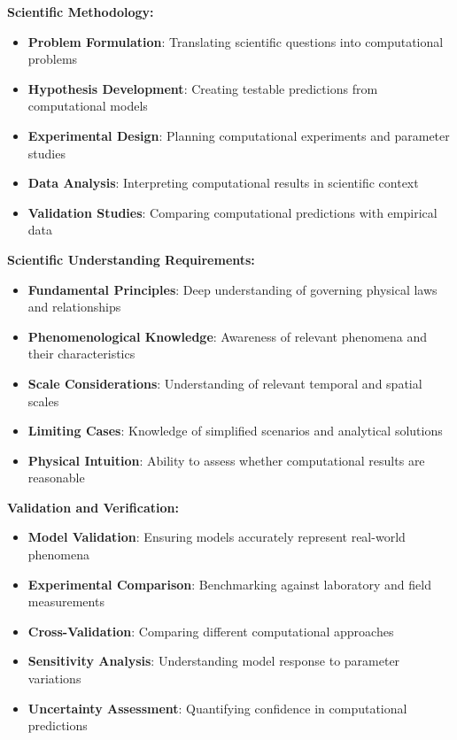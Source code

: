 \textbf{Scientific Methodology:}
\begin{itemize}
    \item \textbf{Problem Formulation}: Translating scientific questions into computational problems
    \item \textbf{Hypothesis Development}: Creating testable predictions from computational models
    \item \textbf{Experimental Design}: Planning computational experiments and parameter studies
    \item \textbf{Data Analysis}: Interpreting computational results in scientific context
    \item \textbf{Validation Studies}: Comparing computational predictions with empirical data
\end{itemize}

\textbf{Scientific Understanding Requirements:}
\begin{itemize}
    \item \textbf{Fundamental Principles}: Deep understanding of governing physical laws and relationships
    \item \textbf{Phenomenological Knowledge}: Awareness of relevant phenomena and their characteristics
    \item \textbf{Scale Considerations}: Understanding of relevant temporal and spatial scales
    \item \textbf{Limiting Cases}: Knowledge of simplified scenarios and analytical solutions
    \item \textbf{Physical Intuition}: Ability to assess whether computational results are reasonable
\end{itemize}

\textbf{Validation and Verification:}
\begin{itemize}
    \item \textbf{Model Validation}: Ensuring models accurately represent real-world phenomena
    \item \textbf{Experimental Comparison}: Benchmarking against laboratory and field measurements
    \item \textbf{Cross-Validation}: Comparing different computational approaches
    \item \textbf{Sensitivity Analysis}: Understanding model response to parameter variations
    \item \textbf{Uncertainty Assessment}: Quantifying confidence in computational predictions
\end{itemize}


